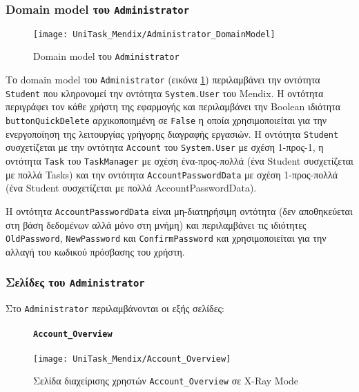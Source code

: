             \subsubsection{Domain model του \texttt{Administrator}}
                \begin{figure}[H] \noindent \centering
                    \texttt{[image: UniTask\_Mendix/Administrator\_DomainModel]}
                    \caption{\centering Domain model του \texttt{Administrator}}
                    \label{fig:unitask_Administrator_DomainModel}
                \end{figure}

                Το domain model του \texttt{Administrator} (εικόνα \ref{fig:unitask_Administrator_DomainModel}) περιλαμβάνει την οντότητα \texttt{Student} που κληρονομεί την οντότητα \texttt{System.User} του Mendix. Η οντότητα περιγράφει τον κάθε χρήστη της εφαρμογής και περιλαμβάνει την Boolean ιδιότητα \texttt{buttonQuickDelete} αρχικοποιημένη σε \texttt{False} η οποία χρησιμοποιείται για την ενεργοποίηση της λειτουργίας γρήγορης διαγραφής εργασιών. Η οντότητα \texttt{Student} συσχετίζεται με την οντότητα \texttt{Account} του \texttt{System.User} με σχέση 1-προς-1, η οντότητα \texttt{Task} του \texttt{TaskManager} με σχέση ένα-προς-πολλά (ένα Student συσχετίζεται με πολλά Tasks) και την οντότητα \texttt{AccountPasswordData} με σχέση 1-προς-πολλά (ένα Student συσχετίζεται με πολλά AccountPasswordData).

                Η οντότητα \texttt{AccountPasswordData} είναι μη-διατηρήσιμη οντότητα (δεν αποθηκεύεται στη βάση δεδομένων αλλά μόνο στη μνήμη) και περιλαμβάνει τις ιδιότητες \texttt{OldPassword}, \texttt{NewPassword} και \texttt{ConfirmPassword} και χρησιμοποιείται για την αλλαγή του κωδικού πρόσβασης του χρήστη.

            \subsubsection{Σελίδες του \texttt{Administrator}}
                Στο \texttt{Administrator} περιλαμβάνονται οι εξής σελίδες:

                \begin{figure}[H] \noindent
                    \paragraph{\texttt{Account\_Overview}}
                    \begin{center}
                        \texttt{[image: UniTask\_Mendix/Account\_Overview]}
                        \caption{\centering Σελίδα διαχείρισης χρηστών \texttt{Account\_Overview} σε X-Ray Mode}
                        \label{fig:unitask_Account_Overview}
                    \end{center}
                \end{figure}

